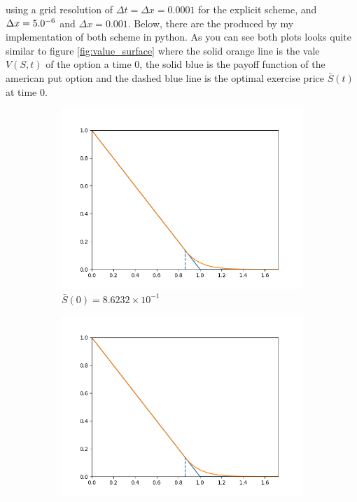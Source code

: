 \documentclass[a4paper,12pt]{article}
\begin{document}
  using a grid resolution of $\Delta t = \Delta x = 0.0001$ for the explicit scheme, and
  $\Delta x = 5.0 \time 10^{-6}$ and $\Delta x = 0.001$. Below, there are the produced by
  my implementation of both scheme in python. As you can see both plots looks quite similar 
  to figure \eqref{fig:value_surface} where the solid orange line is the vale $V(S, t)$ of the option a time 0, the solid blue
  is the payoff function of the american put option and the dashed blue line is the optimal
  exercise price $\bar{S}(t)$ at time 0.

  \begin{figure}[H]
    \centering
    \begin{subfigure}[b]{0.5\textwidth}
        \centering
        \includegraphics[width=\textwidth]{progress_report/Front_fixing_explicit_FD.png}
        \caption{$\bar{S}(0) = 8.6232 \times 10^{-1}$}
        \label{fig:y equals }
    \end{subfigure}
    \hspace{-1cm}
    \begin{subfigure}[b]{0.5\textwidth}
        \centering
        \includegraphics[width=\textwidth]{progress_report/Front_fixing_implicit_FD.png}

\end{subfigure}
\end{figure}
\end{document}
